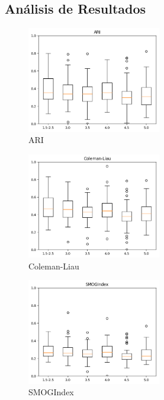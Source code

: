\documentclass[12pt,journal,compsoc]{IEEEtran}
\begin{document}
\subsection{Análisis de Resultados}

\begin{minipage}{\linewidth}
  \centering
  \begin{minipage}{0.25\linewidth}
      \begin{figure}[H]
          \includegraphics[width=2.3in]{../unigrams/scripts/boxplots/ARI.png}
          \caption{ARI}
      \end{figure}
  \end{minipage}
  \hspace{0.05\linewidth}
  \begin{minipage}{0.25\linewidth}
      \begin{figure}[H]
          \includegraphics[width=2.3in]{../unigrams/scripts/boxplots/Coleman-Liau.png}
          \caption{Coleman-Liau}
      \end{figure}
  \end{minipage}
  \hspace{0.05\linewidth}
  \begin{minipage}{0.25\linewidth}
      \begin{figure}[H]
          \includegraphics[width=2.3in]{../unigrams/scripts/boxplots/SMOGIndex.png}
          \caption{SMOGIndex}
      \end{figure}
  \end{minipage}
\end{minipage}
\end{document}
